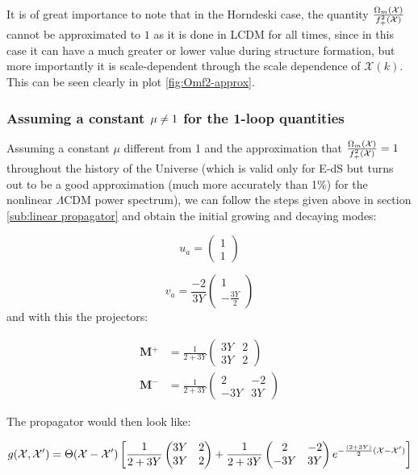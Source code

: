 It is of great importance to note that in the Horndeski case, the
quantity $\frac{\Omega_{m}(\mathcal{X})}{f_{+}^{2}(\mathcal{X})}$ cannot be
approximated to $1$ as it is done in LCDM for all times, since in
this case it can have a much greater or lower value during structure
formation, but more importantly it is scale-dependent through the
scale dependence of $\mathcal{X}(k)$. This can be seen clearly in
plot \ref{fig:Omf2-approx}.


\subsubsection*{Assuming a constant $\mu\protect\neq1$ for the 1-loop quantities}

Assuming a constant $\mu$ different from 1 and the approximation
that $\frac{\Omega_{m}(\mathcal{X})}{f_{+}^{2}(\mathcal{X})}=1$ throughout
the history of the Universe (which is valid only for E-dS but turns
out to be a good approximation (much more accurately than 1\%) for
the nonlinear $\Lambda\textrm{CDM}$ power spectrum), we can follow
the steps given above in section \ref{sub:linear propagator} and
obtain the initial growing and decaying modes:

\[
u_{a}=\begin{pmatrix}1\\
1
\end{pmatrix}
\]


\[
v_{a}=\frac{-2}{3Y}\begin{pmatrix}1\\
-\frac{3Y}{2}
\end{pmatrix}
\]
and with this the projectors:

\begin{align*}
\mathrm{\mathbf{M}}{}^{+} & =\frac{1}{2+3Y}\begin{pmatrix}3Y & 2\\
3Y & 2
\end{pmatrix}\\
\mathbf{\mathrm{\mathbf{M}}}^{-} & =\frac{1}{2+3Y}\begin{pmatrix}2 & -2\\
-3Y & 3Y
\end{pmatrix}
\end{align*}


The propagator would then look like:

\begin{equation}
g(\mathcal{X},\mathcal{X}')=\Theta(\mathcal{X}-\mathcal{X}')\left[\frac{1}{2+3Y}\begin{pmatrix}3Y & 2\\
3Y & 2
\end{pmatrix}+\frac{1}{2+3Y}\begin{pmatrix}2 & -2\\
-3Y & 3Y
\end{pmatrix}e^{-\frac{(2+3Y)}{2}(\mathcal{X}-\mathcal{X}')}\right]\label{eq:ghorn}
\end{equation}


